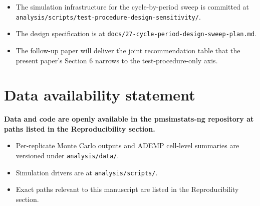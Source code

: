 \documentclass[
  11pt,
]{article}
\begin{document}
\begin{itemize}\setlength{\itemsep}{2pt}\setlength{\parskip}{0pt}
\item The simulation infrastructure for the cycle-by-period sweep is committed at \texttt{analysis/scripts/test-procedure-design-sensitivity/}.
\item The design specification is at \texttt{docs/27-cycle-period-design-sweep-plan.md}.
\item The follow-up paper will deliver the joint recommendation table that the present paper's Section 6 narrows to the test-procedure-only axis.
\end{itemize}

\section{Data availability statement}\label{data-availability-statement}

\textbf{Data and code are openly available in the pmsimstats-ng repository at paths listed in the Reproducibility section.}

\begin{itemize}\setlength{\itemsep}{2pt}\setlength{\parskip}{0pt}
\item Per-replicate Monte Carlo outputs and ADEMP cell-level summaries are versioned under \texttt{analysis/data/}.
\item Simulation drivers are at \texttt{analysis/scripts/}.
\item Exact paths relevant to this manuscript are listed in the Reproducibility section.
\end{itemize}
\end{document}

